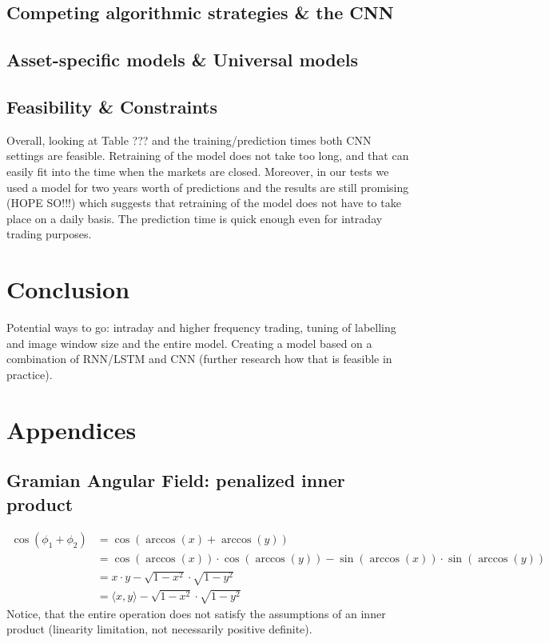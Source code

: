 \documentclass[11pt, a4paper]{article}
\begin{document}
\subsection{Competing algorithmic strategies \& the CNN}


\subsection{Asset-specific models \& Universal models}

\subsection{Feasibility \& Constraints}
Overall, looking at Table ??? and the training/prediction times both CNN settings are feasible. Retraining of the model does not take too long, and that can easily fit into the time when the markets are closed. Moreover, in our tests we used a model for two years worth of predictions and the results are still promising (HOPE SO!!!) which suggests that retraining of the model does not have to take place on a daily basis. The prediction time is quick enough even for intraday trading purposes. 

\section{Conclusion}
\label{sec:Conclusion}

Potential ways to go: intraday and higher frequency trading, tuning of labelling and image window size and the entire model. Creating a model based on a combination of RNN/LSTM and CNN (further research how that is feasible in practice).

\section{Appendices}
\label{sec:App}

\subsection{Gramian Angular Field: penalized inner product}
\label{app:GAF}
\begin{equation}
    \begin{split}
        \cos(\phi_1 + \phi_2)  & = \cos(\arccos(x) + \arccos(y)) \\
        & = \cos(\arccos(x)) \cdot \cos(\arccos(y)) - \sin(\arccos(x)) \cdot \sin(\arccos(y))\\
        & = x\cdot y - \sqrt{1-x^2} \cdot \sqrt{1-y^2}\\
        & = \langle x, y \rangle - \sqrt{1-x^2} \cdot \sqrt{1-y^2}
    \end{split}
\end{equation}
 Notice, that the entire operation does not satisfy the assumptions of an inner product (linearity limitation, not necessarily positive definite).
\end{document}
